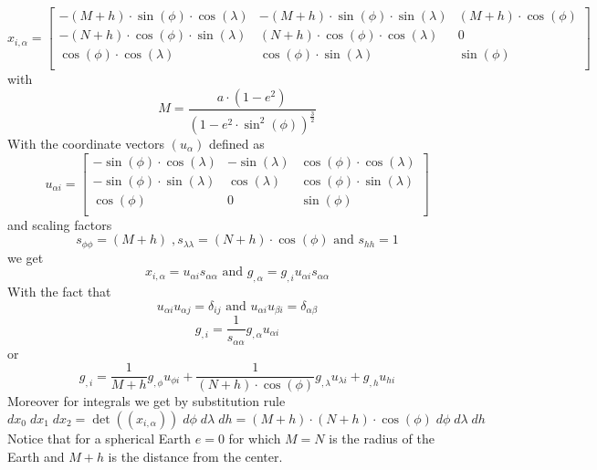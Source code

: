 \begin{equation}
 x_{i,\alpha}
= 
\left[
\begin{array}{ccc}
-(M + h) \cdot \sin(\phi) \cdot  \cos(\lambda) & -(M + h) \cdot  \sin(\phi) \cdot  \sin(\lambda) & (M  + h )  \cdot  \cos(\phi) \\
 - (N + h) \cdot \cos(\phi) \cdot  \sin(\lambda) & (N + h)  \cdot  \cos(\phi) \cdot  \cos(\lambda) & 0 \\
 \cos(\phi) \cdot  \cos(\lambda)  & \cos(\phi) \cdot  \sin(\lambda) &   \sin(\phi) \\
\end{array}
\right]
\end{equation}
with 
\begin{equation}
 M = \frac{a \cdot  (1-e^2) }{(1- e^2 \cdot \sin^2(\phi))^{\frac{3}{2}}}
\label{equ:geodetic:5}
\end{equation}
With the coordinate vectors $(u_{\alpha})$ defined as 
\begin{equation}
 u_{\alpha i}
= 
\left[
\begin{array}{ccc}
-\sin(\phi) \cdot  \cos(\lambda)  & -  \sin(\lambda) &  \cos(\phi) \cdot  \cos(\lambda)  \\
- \sin(\phi) \cdot  \sin(\lambda)  &  \cos(\lambda)  &  \cos(\phi) \cdot  \sin(\lambda)  \\
\cos(\phi)                       &   0               &   \sin(\phi)  \\
\end{array}
\right]
\end{equation}
and scaling factors 
\begin{equation}
s_{\phi \phi} = (M + h) \; , 
s_{\lambda \lambda} =  (N + h) \cdot \cos(\phi) \mbox{ and }
s_{h h} = 1
\end{equation}
we get 
\begin{equation}
 x_{i,\alpha} =  u_{\alpha i} s_{\alpha \alpha} \mbox{ and }   g_{,\alpha}   =    g_{,i} u_{\alpha i} s_{\alpha \alpha} 
\end{equation}
With the fact that 
\begin{equation}
 u_{\alpha i} u_{\alpha j} = \delta_{ij} \mbox{ and }  u_{\alpha i} u_{\beta i} = \delta_{\alpha \beta}
\end{equation}
\begin{equation}
g_{,i} = \frac{1}{ s_{\alpha \alpha}} g_{,\alpha}  u_{\alpha i} 
\end{equation}
or 
\begin{equation}
g_{,i} = \frac{1}{M + h} g_{,\phi}  u_{\phi i} + 
\frac{1}{(N + h) \cdot \cos(\phi) } g_{,\lambda}  u_{\lambda i} +
g_{,h}  u_{h i} 
\end{equation} 
Moreover for integrals we get by substitution rule 
\begin{equation}
dx_0 \; dx_1  \;  dx_2 =\det((x_{i,\alpha}))  \;  d \phi  \;   d\lambda   \;  dh 
=  (M + h) \cdot (N + h) \cdot \cos(\phi)  \;  d \phi  \;  d\lambda  \;  dh 
\end{equation} 
Notice that for a spherical Earth $e=0$ for which $M=N$ is the radius of the Earth and $M+h$ is the distance from
the center.  